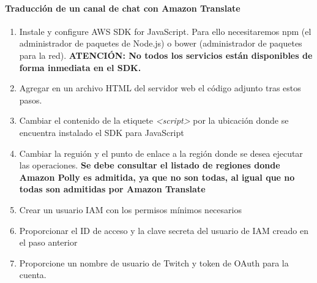 \documentclass[runningheads]{llncs}
\begin{document}
\paragraph{Traducción de un canal de chat con Amazon Translate}
\begin{enumerate}
    \item Instale y configure AWS SDK for JavaScript. Para ello necesitaremos npm (el administrador de paquetes de Node.js) o bower (administrador de paquetes para la red). \textbf{ATENCIÓN: No todos los servicios están disponibles de forma inmediata en el SDK.}
    \item Agregar en un archivo HTML del servidor web el código adjunto tras estos pasos.

    \item Cambiar el contenido de la etiquete \textit{<script>}
    por la ubicación donde se encuentra instalado el SDK para JavaScript
    \item Cambiar la reguión y el punto de enlace a la región donde se desea ejecutar las operaciones. \textbf{Se debe consultar el listado de regiones donde Amazon Polly es admitida, ya que no son todas, al igual que no todas son admitidas por Amazon Translate}
    \item Crear un usuario IAM con los permisos mínimos necesarios
    \item Proporcionar el ID de acceso y la clave secreta del usuario de IAM creado en el paso anterior
    \item Proporcione un nombre de usuario de Twitch y token de OAuth para la cuenta.
\end{enumerate}
\end{document}
